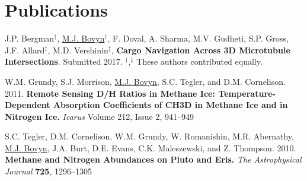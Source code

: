 \documentclass[letterpaper,10pt]{article} %
\begin{document}
%
%
%
%
%
%
%
%


\section{Publications}

J.P. Bergman$^\dagger$, \underline{M.J. Bovyn}$^\dagger$, F. Doval, A. Sharma, M.V. Gudheti, S.P. Gross, J.F. Allard$^\ddagger$, M.D. Vershinin$^\ddagger$, \textbf{Cargo Navigation Across 3D Microtubule Intersections}. Submitted 2017. $^\dagger$,$^\ddagger$ These authors contributed equally.

W.M. Grundy, S.J. Morrison, \underline{M.J. Bovyn}, S.C. Tegler, and D.M. Cornelison. 2011. \textbf{Remote Sensing D/H Ratios in Methane Ice: Temperature-Dependent Absorption Coefficients of CH3D in Methane Ice and in Nitrogen Ice.} \textit{Icarus} Volume 212, Issue 2, 941--949

S.C. Tegler, D.M. Cornelison, W.M. Grundy, W. Romanishin, M.R. Abernathy, \underline{M.J. Bovyn}, J.A. Burt, D.E. Evans, C.K. Maleszewski, and Z. Thompson. 2010. \textbf{Methane and Nitrogen Abundances on Pluto and Eris.} \textit{The Astrophysical Journal} \textbf{725}, 1296--1305
\end{document}
